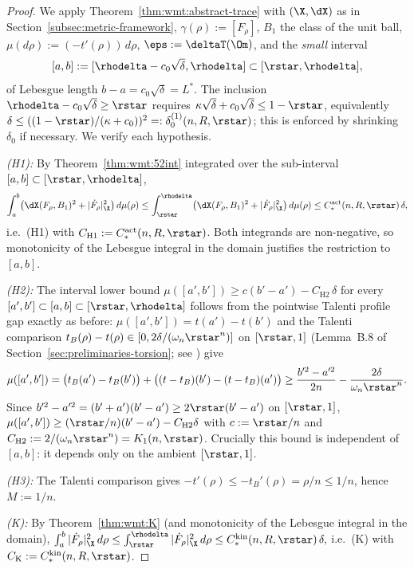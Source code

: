 \begin{proof}
We apply Theorem~\ref{thm:wmt:abstract-trace} with
$(\X,\dX)$ as in Section~\ref{subsec:metric-framework},
$\gamma(\rho):=[F_\rho]$, $B_1$ the class of the unit ball,
$\mu(d\rho):=(-t'(\rho))\,d\rho$, $\eps:=\deltaT(\Om)$, and the
\emph{small} interval
\[
   [a,b]:=[\rhodelta-c_0\sqrt{\delta},\rhodelta]\subset[\rstar,\rhodelta],
\]
of Lebesgue length $b-a=c_0\sqrt{\delta}=L^*$. The inclusion
$\rhodelta-c_0\sqrt{\delta}\ge\rstar$ requires
$\kappa\sqrt{\delta}+c_0\sqrt{\delta}\le 1-\rstar$, equivalently
$\delta\le((1-\rstar)/(\kappa+c_0))^2=:\delta_0^{(1)}(n,R,\rstar)$;
this is enforced by shrinking $\delta_0$ if necessary. We verify each
hypothesis.

\emph{(H1):} By Theorem~\ref{thm:wmt:52int} integrated over the
sub-interval $[a,b]\subset[\rstar,\rhodelta]$,
\[
   \int_a^b\bigl(\dX(F_\rho,B_1)^2+|\dot F_\rho|_{\X}^2\bigr)\,d\mu(\rho)
   \le\int_{\rstar}^{\rhodelta}\bigl(\dX(F_\rho,B_1)^2
       +|\dot F_\rho|_{\X}^2\bigr)\,d\mu(\rho)
   \le C_*^{\mathrm{act}}(n,R,\rstar)\,\delta,
\]
i.e.\ (H1) with $C_{\mathrm H1}:=C_*^{\mathrm{act}}(n,R,\rstar)$. Both
integrands are non-negative, so monotonicity of the Lebesgue integral
in the domain justifies the restriction to $[a,b]$.

\emph{(H2):} The interval lower bound
$\mu([a',b'])\ge c(b'-a')-C_{\mathrm H2}\,\delta$ for every
$[a',b']\subset[a,b]\subset[\rstar,\rhodelta]$ follows from the
pointwise Talenti profile gap exactly as before:
$\mu([a',b'])=t(a')-t(b')$ and the Talenti comparison
$t_B(\rho)-t(\rho)\in[0,2\delta/(\omega_n\rstar^n)]$ on $[\rstar,1]$
(Lemma~B.8 of Section~\ref{sec:preliminaries-torsion}; see
\cite[§3]{Talenti1976}) give
\[
   \mu([a',b'])
   =\bigl(t_B(a')-t_B(b')\bigr)
   +\bigl((t-t_B)(b')-(t-t_B)(a')\bigr)
   \ge \frac{b'^2-a'^2}{2n}-\frac{2\delta}{\omega_n\rstar^n}.
\]
Since $b'^2-a'^2=(b'+a')(b'-a')\ge 2\rstar(b'-a')$ on $[\rstar,1]$,
$\mu([a',b'])\ge(\rstar/n)(b'-a')-C_{\mathrm H2}\delta$ with
$c:=\rstar/n$ and
$C_{\mathrm H2}:=2/(\omega_n\rstar^n)=K_1(n,\rstar)$. Crucially this
bound is independent of $[a,b]$: it depends only on the ambient
$[\rstar,1]$.

\emph{(H3):} The Talenti comparison gives
$-t'(\rho)\le -t_B'(\rho)=\rho/n\le 1/n$, hence $M:=1/n$.

\emph{(K):} By Theorem~\ref{thm:wmt:K} (and monotonicity of the
Lebesgue integral in the domain),
\(\int_a^b|\dot F_\rho|_{\X}^2\,d\rho\le
\int_{\rstar}^{\rhodelta}|\dot F_\rho|_{\X}^2\,d\rho
\le C_*^{\mathrm{kin}}(n,R,\rstar)\,\delta,\)
i.e.\ (K) with $C_{\mathrm K}:=C_*^{\mathrm{kin}}(n,R,\rstar)$.


\end{proof}
